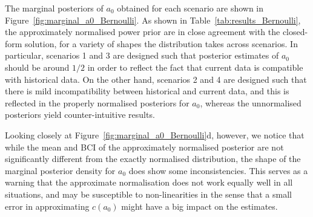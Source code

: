 \documentclass[a4paper, notitlepage, 11pt]{article}
\begin{document}
The marginal posteriors of $a_0$ obtained for each scenario are shown in Figure~\ref{fig:marginal_a0_Bernoulli}.
As shown in Table~\ref{tab:results_Bernoulli}, the approximately normalised power prior are in close agreement with the closed-form solution, for a variety of shapes the distribution takes across scenarios.
In particular, scenarios 1 and 3 are designed such that posterior estimates of $a_0$ should be around $1/2$ in order to reflect the fact that current data is compatible with historical data.
On the other hand, scenarios 2 and 4 are designed such that there is mild incompatibility between historical and current data, and this is reflected in the properly normalised posteriors for $a_0$, whereas the unnormalised posteriors yield counter-intuitive results.

Looking closely at Figure~\ref{fig:marginal_a0_Bernoulli}d, however, we notice that while the mean and BCI of the approximately normalised posterior are not significantly different from the exactly normalised distribution, the shape of the marginal posterior density for $a_0$ does show some inconsistencies.
This serves as a warning that the approximate normalisation does not work equally well in all situations, and may be susceptible to non-linearities in the sense that a small error in approximating $c(a_0)$ might have a big impact on the estimates.
\end{document}
